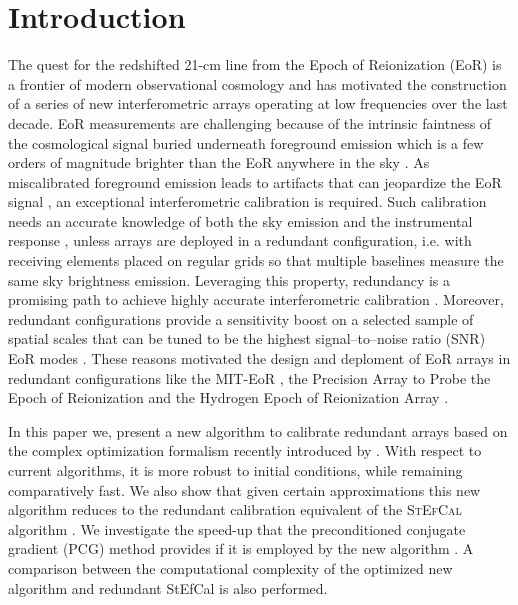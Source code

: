 \documentclass[useAMS,usenatbib]{mn2e}
\begin{document}
\section{Introduction}
The quest for the redshifted 21-cm line from the Epoch of Reionization (EoR) is a frontier of modern observational cosmology and has motivated the construction of a series of new interferometric arrays operating at low frequencies over the last decade. EoR measurements are challenging because of the intrinsic faintness of the cosmological signal \citep[see, for instance,][for recent reviews]{Furlanetto2016,McQuinn2016} buried underneath foreground emission which is a few orders of magnitude brighter than the EoR anywhere in the sky \citep[e.g.,][]{Bernardi2009,Bernardi2010,Ghosh2012,Dillon2014,Parsons2014}. 
As miscalibrated foreground emission leads to artifacts that can jeopardize the EoR signal \citep[e.g.,][]{grobler2014,barry2016,ewall-wice2016}, an exceptional interferometric calibration is required. Such calibration needs an accurate knowledge of both the sky emission and the instrumental response \citep[e.g.,][]{Smirnov2011c}, unless arrays are deployed in a redundant configuration, i.e. with receiving elements placed on regular grids so that multiple baselines measure the same sky brightness emission. Leveraging this property, redundancy is a promising path to achieve highly accurate interferometric calibration \citep[][]{Noordam1982,Wieringa1992,Pearson1984,Liu2010,Noorishad2012,Marthi2014,Sievers2017}. Moreover, redundant configurations provide a sensitivity boost on a selected sample of spatial scales that can be tuned to be the highest signal--to--noise ratio (SNR) EoR modes \citep[][]{Parsons2012,Dillon2016}. These reasons motivated the design and deploment of EoR arrays in redundant configurations like the MIT-EoR \citep{Zheng2014}, the Precision Array to Probe the Epoch of Reionization \citep[PAPER,][]{Ali2015} and the Hydrogen Epoch of Reionization Array \citep[HERA,][]{deboer2017}. 

In this paper we, present a new algorithm to calibrate redundant arrays based on the complex optimization formalism recently introduced by \cite{Smirnov2015}. 
With respect to current algorithms, it is more robust to initial conditions, while remaining comparatively fast. We also show that given certain approximations this new algorithm reduces to the redundant calibration equivalent of the \textsc{StEfCal} algorithm \citep{Salvini2014}.
We investigate the speed-up that the preconditioned conjugate gradient (PCG) method provides if it is employed by the new algorithm \citep{Liu2010}.
A comparison between the computational complexity of the optimized new algorithm and redundant StEfCal is also performed.
\end{document}
